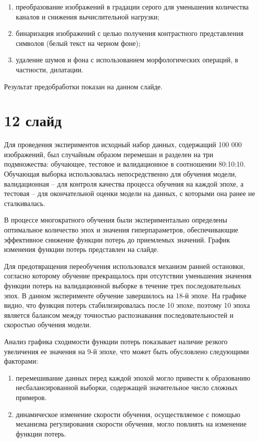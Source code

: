 \documentclass{altsu-report}
\begin{document}
\begin{enumerate}
    \item преобразование изображений в градации серого для уменьшения количества 
    каналов и снижения вычислительной нагрузки;
    \item бинаризация изображений с целью получения контрастного представления 
    символов (белый текст на черном фоне);
    \item удаление шумов и фона с использованием морфологических операций, в 
    частности, дилатации.
\end{enumerate}

Результат предобработки показан на данном слайде.

\section*{12 слайд}

Для проведения экспериментов исходный набор данных, содержащий 100 000 
изображений, был случайным образом перемешан и разделен на три подмножества: 
обучающее, тестовое и валидационное в соотношении 80:10:10. Обучающая выборка 
использовалась непосредственно для обучения модели, валидационная -- для контроля 
качества процесса обучения на каждой эпохе, а тестовая -- для окончательной 
оценки модели на данных, с которыми она ранее не сталкивалась.

В процессе многократного обучения были экспериментально определены оптимальное 
количество эпох и значения гиперпараметров, обеспечивающие эффективное снижение 
функции потерь до приемлемых значений. График изменения функции потерь 
представлен на слайде.

Для предотвращения переобучения использовался механизм ранней остановки, согласно 
которому обучение прекращалось при отсутствии уменьшения значения функции потерь 
на валидационной выборке в течение трех последовательных эпох. В данном 
эксперименте обучение завершилось на 18-й эпохе. На графике видно, что функция 
потерь стабилизировалась после 10 эпохе, поэтому 10 эпоха является балансом между 
точностью распознавания последовательностей и скоростью обучения модели.

Анализ графика сходимости функции потерь показывает наличие резкого увеличения ее 
значения на 9-й эпохе, что может быть обусловлено следующими факторами:

\begin{enumerate}
    \item перемешивание данных перед каждой эпохой могло привести к образованию 
    несбалансированной выборки, содержащей значительное число сложных примеров.
    \item динамическое изменение скорости обучения, осуществляемое с помощью 
    механизма регулирования скорости обучения, могло повлиять на изменение 
    функции потерь.
\end{enumerate}
\end{document}
